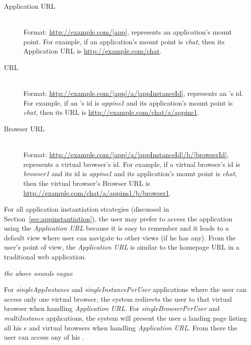 \begin{description}

\item[Application URL] \label{itm:appurl} \hfill \\
Format: \url{http://example.com/[app]}, \code{[app]} represents an
application's mount point.   For example, if an application's mount point is
\emph{chat},  then its Application URL is \url{http://example.com/chat}.


\item[\appins{} URL] \label{itm:appinsurl} \hfill \\
Format: \url{http://example.com/[app]/a/[appInstanceId]},
\code{[appInstanceId]} represents an \appins{}'s id.  For example, if an
\appins{}'s id is \emph{appins1} and its application's mount point is
\emph{chat}, then its \appins{} URL is
\url{http://example.com/chat/a/appins1}.


\item[Browser URL] \label{itm:vburl} \hfill \\
Format: \url{http://example.com/[app]/a/[appInstanceId]/b/[browserId]},
\code{[browserId]} represents a virtual browser's id. For example, if a
virtual browser's id is \emph{browser1} and its \appins{} id is 
 \emph{appins1} and its application's mount point is \emph{chat},
  then the virtual browser's
Browser URL is \url{http://example.com/chat/a/appins1/b/browser1}.

\end{description}



For all application instantiation strategies (discussed in
Section~\ref{sec:appinstantiation}), the user may prefer to access
the application using the \emph{Application URL} because it is easy to
remember and it leads to a default view where user can navigate to other
views (if he has any).  
From the user's point of view,
the \emph{Application URL} is similar to the homepage URL in a traditional web application.

\emph{the above sounds vague}

For \emph{singleAppInstance}   and \emph{singleInstancePerUser}
applications where the user can access only one virtual browser, the system
redirects the user to that virtual browser when handling \emph{Application URL}. 
For \emph{singleBrowserPerUser} and \emph{multiInstance} applications, the
system will present the user a landing page listing all his \appins{}s and
virtual browsers when handling \emph{Application URL}. From there the user can
access any of his \appins{}.

